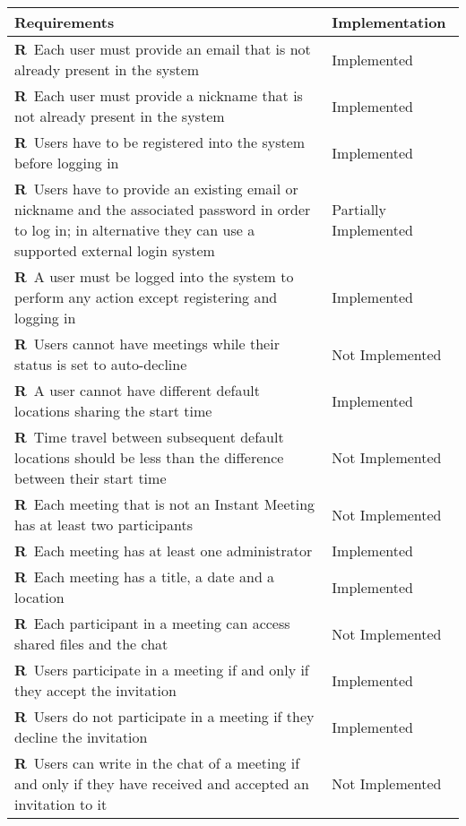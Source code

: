 \def\arraystretch{1.5}
\begin{longtable}{|m{7cm}|m{7cm}|}
	\hline
	\textbf{Requirements}            & 		\textbf{Implementation}		    \\ \hline
	\textbf{R\reqNum}~Each user must provide an email that is not already present in the system & Implemented	\\ \hline
	\textbf{R\reqNum}~Each user must provide a nickname that is not already present in the system & Implemented	\\ \hline
	\textbf{R\reqNum}~Users have to be registered into the system before logging in & Implemented	\\ \hline
	\textbf{R\reqNum}~Users have to provide an existing email or nickname and the associated password in order to log in; in alternative they can use a supported external login system & Partially Implemented	\\ \hline
	\textbf{R\reqNum}~A user must be logged into the system to perform any action except registering and logging in & Implemented	\\ \hline
	\textbf{R\reqNum}~Users cannot have meetings while their status is set to auto-decline & Not Implemented	\\ \hline
	\textbf{R\reqNum}~A user cannot have different default locations sharing the start time & Implemented	\\ \hline
	\textbf{R\reqNum}~Time travel between subsequent default locations should be less than the difference between their start time & Not Implemented	\\ \hline
	\textbf{R\reqNum}~Each meeting that is not an Instant Meeting has at least two participants & Not Implemented	\\ \hline
	\textbf{R\reqNum}~Each meeting has at least one administrator & Implemented	\\ \hline
	\textbf{R\reqNum}~Each meeting has a title, a date and a location & Implemented	\\ \hline
	\textbf{R\reqNum}~Each participant in a meeting can access shared files and the chat & Not Implemented \\ \hline
	\textbf{R\reqNum}~Users participate in a meeting if and only if they accept the invitation & Implemented	\\ \hline
	\textbf{R\reqNum}~Users do not participate in a meeting if they decline the invitation & Implemented	\\ \hline
	\textbf{R\reqNum}~Users can write in the chat of a meeting if and only if they have received and accepted an invitation to it & Not Implemented	\\ \hline

\end{longtable}
